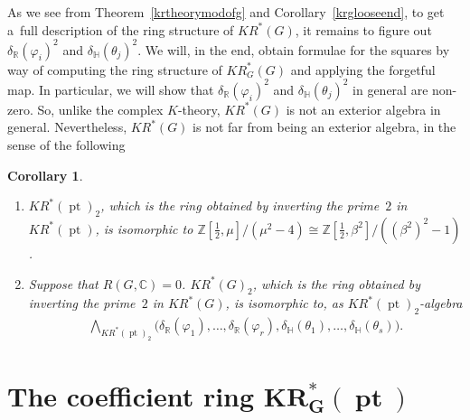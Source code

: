 \documentclass[11pt]{article}
\numberwithin{equation}{section}
\newtheorem{Corollary}[Theorem]{Corollary}
\DeclareMathOperator{\pt}{pt}
\begin{document}
As we see from Theorem~\ref{krtheorymodofg} and Corollary~\ref{krglooseend}, to get a~full description of the ring
structure of $KR^*(G)$, it remains to f\/igure out $\delta_\mathbb{R}(\varphi_i)^2$ and $\delta_\mathbb{H}(\theta_j)^2$.
We will, in the end, obtain formulae for the squares by way of computing the ring structure of $KR_G^*(G)$ and applying
the forgetful map.
In particular, we will show that $\delta_\mathbb{R}(\varphi_i)^2$ and $\delta_\mathbb{H}(\theta_j)^2$ in general are
non-zero.
So, unlike the complex $K$-theory, $KR^*(G)$ is not an exterior algebra in general.
Nevertheless, $KR^*(G)$ is not far from being an exterior algebra, in the sense of the following
\begin{Corollary}\quad
\begin{enumerate}\itemsep=0pt
\item[$1.$]
$KR^*(\pt)_2$, which is the ring obtained by inverting the prime~$2$ in $KR^*(\pt)$, is isomorphic to
$\mathbb{Z}\left[\frac{1}{2}, \mu\right]/(\mu^2-4)\cong\mathbb{Z}\left[\frac{1}{2}, \beta^2\right]/((\beta^2)^2-1)$.
\item[$2.$]
Suppose that $R(G, \mathbb{C})=0$.
$KR^*(G)_2$, which is the ring obtained by inverting the prime~$2$ in $KR^*(G)$, is isomorphic to, as
$KR^*(\pt)_2$-algebra
\begin{gather*}
\bigwedge\nolimits_{KR^*(\pt)_2}\big(\delta_\mathbb{R}(\varphi_1), \dots, \delta_\mathbb{R}(\varphi_r),
\delta_\mathbb{H}(\theta_1), \dots, \delta_\mathbb{H}(\theta_s)\big).
\end{gather*}
\end{enumerate}
\end{Corollary}

\section[The coef\/f\/icient ring $KR_G^*(\pt)$]{The coef\/f\/icient ring $\boldsymbol{KR_G^*(\pt)}$}\label{Section3}
\end{document}
